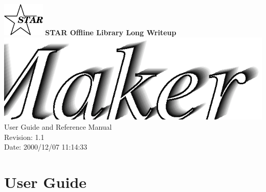 \documentclass[twoside]{article}
\begin{document}
%
%
\begin{titlepage}
\pagestyle{empty}
\vspace*{-35mm}
\begin{center}
  \mbox{\includegraphics[width=2cm]{StarIcon.eps}}
  {\Large\bf STAR Offline Library Long Writeup}
  \hfill\mbox{}\\[3cm]
  \mbox{\includegraphics[width=\textwidth]{StEstMakerTitle.eps}}
  \hfill\mbox{}\\[3cm]
  {\LARGE User Guide and Reference Manual}\\[2cm]
  {\LARGE $ $Revision: 1.1 $ $}  \\[5mm] %
  {\LARGE $ $Date: 2000/12/07 11:14:33 $ $}  %
  \vfill
\end{center}
\cleardoublepage
\end{titlepage}

%
%
\tableofcontents
\cleardoublepage

%
%
\part{User Guide}

\end{document}
